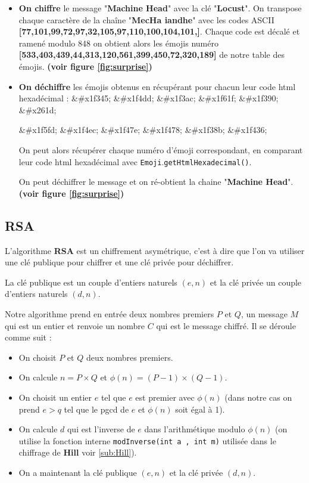 \documentclass{article}
\begin{document}
\begin{itemize}
\item \textbf{On chiffre} le message "\textbf{Machine Head}" avec la clé "\textbf{Locust}". On transpose chaque caractère de la chaîne "\textbf{MecHa iandhe}" avec les codes ASCII \textbf{[77,101,99,72,97,32,105,97,110,100,104,101,]}.
Chaque code est décalé et ramené modulo 848 on obtient alors les émojis numéro \textbf{[533,403,439,44,313,120,561,399,450,72,320,189]} de notre table des émojis. \textbf{(voir figure \ref{fig:surprise})}

\item \textbf{On déchiffre} les émojis obtenus en récupérant pour chacun leur code html hexadécimal : \&\#x1f345; \&\#x1f4dd; \&\#x1f3ac; \&\#x1f61f; \&\#x1f390; \&\#x261d;

\&\#x1f5fd; \&\#x1f4ec; \&\#x1f47e; \&\#x1f478; \&\#x1f38b; \&\#x1f436;
\vspace{1\baselineskip} 

On peut alors récupérer chaque numéro d'émoji correspondant, en comparant leur code html hexadécimal avec \verb+Emoji+.\verb+getHtmlHexadecimal()+. 

On peut déchiffrer le message et on ré-obtient la chaine "\textbf{Machine Head}". \textbf{(voir figure \ref{fig:surprise})}

\end{itemize}


\subsection{RSA}

L'algorithme \textbf{RSA} est un chiffrement asymétrique, c'est à dire que l'on va utiliser une clé publique pour chiffrer et une clé privée pour déchiffrer.

La clé publique est un couple d'entiers naturels $(e,n)$ et la clé privée un couple d'entiers naturels $(d,n)$.

Notre algorithme prend en entrée deux nombres premiers $P$ et $Q$, un message $M$ qui est un entier et renvoie un nombre $C$ qui est le message chiffré. Il se déroule comme suit : 

\begin{itemize}
\item On choisit $P$ et $Q$ deux nombres premiers.
\item On calcule $n = P \times Q$ et $\phi(n) = (P-1)\times(Q-1)$.
\item On choisit un entier $e$ tel que $e$ est premier avec $\phi(n)$ (dans notre cas on prend $e > q$ tel que le pgcd de $e$ et $\phi(n)$ soit égal à 1).
\item On calcule $d$ qui est l'inverse de $e$ dans l'arithmétique modulo $\phi(n)$ (on utilise la fonction interne \verb+modInverse(int a , int m)+ utilisée dans le chiffrage de \textbf{Hill} voir \ref{sub:Hill}).
\item On a maintenant la clé publique $(e,n)$ et la clé privée $(d,n)$.
\end{itemize} 
\vspace{1\baselineskip}
\end{document}
